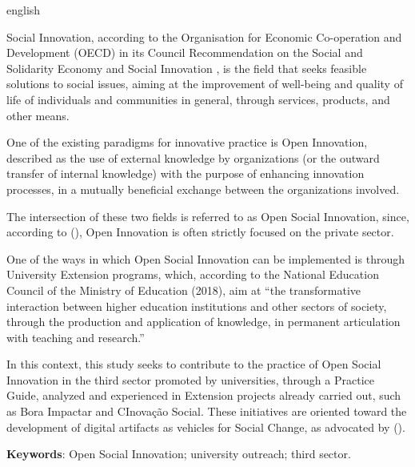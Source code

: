 \begin{resumo}[Abstract]
\begin{otherlanguage*}{english}

Social Innovation, according to the Organisation for Economic Co-operation and Development (OECD) in its Council Recommendation on the Social and Solidarity Economy and Social Innovation \cite{ocde2024social}, is the field that seeks feasible solutions to social issues, aiming at the improvement of well-being and quality of life of individuals and communities in general, through services, products, and other means.

One of the existing paradigms for innovative practice is Open Innovation, described as the use of external knowledge by organizations (or the outward transfer of internal knowledge) with the purpose of enhancing innovation processes, in a mutually beneficial exchange between the organizations involved.

The intersection of these two fields is referred to as Open Social Innovation, since, according to \citeauthor{chesbrough2014} (\citeyear{chesbrough2014}), Open Innovation is often strictly focused on the private sector.

One of the ways in which Open Social Innovation can be implemented is through University Extension programs, which, according to the National Education Council of the Ministry of Education (2018), aim at “the transformative interaction between higher education institutions and other sectors of society, through the production and application of knowledge, in permanent articulation with teaching and research.”

In this context, this study seeks to contribute to the practice of Open Social Innovation in the third sector promoted by universities, through a Practice Guide, analyzed and experienced in Extension projects already carried out, such as Bora Impactar and CInovação Social. These initiatives are oriented toward the development of digital artifacts as vehicles for Social Change, as advocated by \citeauthor{ferrario2014} (\citeyear{ferrario2014}).



   \vspace{\onelineskip} 
 
   \noindent 
   \textbf{Keywords}: Open Social Innovation; university outreach; third sector.
 \end{otherlanguage*}
 \end{resumo}
